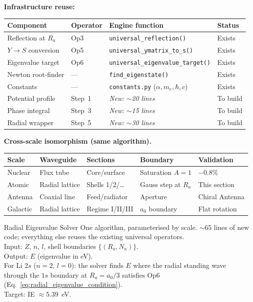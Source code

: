 \noindent\textbf{Infrastructure reuse:}
\begin{center}
\small
\renewcommand{\arraystretch}{1.2}
\begin{tabular}{llll}
\hline
\textbf{Component} & \textbf{Operator}
& \textbf{Engine function} & \textbf{Status} \\
\hline
Reflection at $R_a$ & Op3
& \texttt{universal\_reflection()} & Exists \\
$Y \to S$ conversion & Op5
& \texttt{universal\_ymatrix\_to\_s()} & Exists \\
Eigenvalue target & Op6
& \texttt{universal\_eigenvalue\_target()} & Exists \\
Newton root-finder & ---
& \texttt{find\_eigenstate()} & Exists \\
Constants & ---
& \texttt{constants.py} ($\alpha, m_e, \hbar, c$) & Exists \\
Potential profile & Step~1
& \emph{New: $\sim$20 lines} & To build \\
Phase integral & Step~3
& \emph{New: $\sim$15 lines} & To build \\
Radial wrapper & Step~5
& \emph{New: $\sim$30 lines} & To build \\
\hline
\end{tabular}
\end{center}

\noindent\textbf{Cross-scale isomorphism (same algorithm).}
\begin{center}
\small
\renewcommand{\arraystretch}{1.2}
\begin{tabular}{lllll}
\hline
\textbf{Scale} & \textbf{Waveguide}
& \textbf{Sections} & \textbf{Boundary}
& \textbf{Validation} \\
\hline
Nuclear & Flux tube
& Core/surface & Saturation $A{=}1$
& $-0.8\%$ \\
Atomic & Radial lattice
& Shells 1/2/\ldots & Gauss step at $R_a$
& This section \\
Antenna & Coaxial line
& Feed/radiator & Aperture
& Chiral Antenna \\
Galactic & Radial lattice
& Regime I/II/III & $a_0$ boundary
& Flat rotation \\
\hline
\end{tabular}
\end{center}

\begin{resultbox}{Radial Eigenvalue Solver}
One algorithm, parameterised by scale.  $\sim$65 lines
of new code; everything else reuses the existing
universal operators.\\[4pt]
Input: $Z$, $n$, $l$, shell boundaries
$\{(R_a, N_a)\}$.\\
Output: $E$ (eigenvalue in eV).\\[4pt]
For Li $2s$ ($n{=}2$, $l{=}0$): the solver finds $E$
where the radial standing wave through the $1s$
boundary at $R_a = a_0/3$ satisfies Op6
(Eq.~\ref{eq:radial_eigenvalue_condition}).\\
Target: IE $\approx 5.39$~eV.
\end{resultbox}

